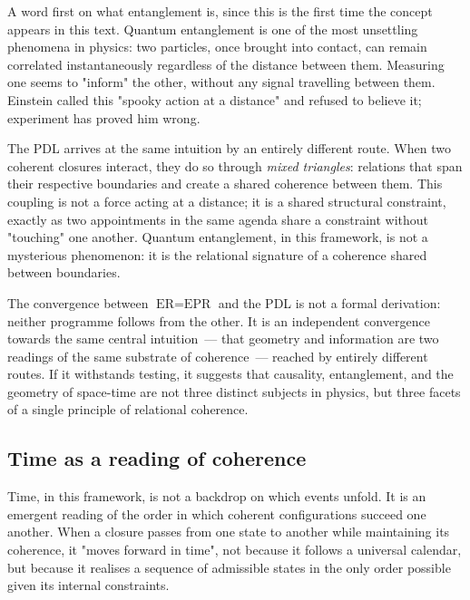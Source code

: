 \documentclass[12pt, a4paper, openright]{book}
\begin{document}
\medskip

A word first on what entanglement is, since this is the first time the concept appears in this text. Quantum entanglement is one of the most unsettling phenomena in physics: two particles, once brought into contact, can remain correlated instantaneously regardless of the distance between them. Measuring one seems to "inform" the other, without any signal travelling between them. Einstein called this "spooky action at a distance" and refused to believe it; experiment has proved him wrong.

\medskip

The PDL arrives at the same intuition by an entirely different route. When two coherent closures interact, they do so through \emph{mixed triangles}: relations that span their respective boundaries and create a shared coherence between them. This coupling is not a force acting at a distance; it is a shared structural constraint, exactly as two appointments in the same agenda share a constraint without "touching" one another. Quantum entanglement, in this framework, is not a mysterious phenomenon: it is the relational signature of a coherence shared between boundaries.

\medskip

The convergence between $\text{ER} = \text{EPR}$ and the PDL is not a formal derivation: neither programme follows from the other. It is an independent convergence towards the same central intuition~--- that geometry and information are two readings of the same substrate of coherence~--- reached by entirely different routes. If it withstands testing, it suggests that causality, entanglement, and the geometry of space-time are not three distinct subjects in physics, but three facets of a single principle of relational coherence.

\subsection*{Time as a reading of coherence}

Time, in this framework, is not a backdrop on which events unfold. It is an emergent reading of the order in which coherent configurations succeed one another. When a closure passes from one state to another while maintaining its coherence, it "moves forward in time", not because it follows a universal calendar, but because it realises a sequence of admissible states in the only order possible given its internal constraints.

\medskip
\end{document}
